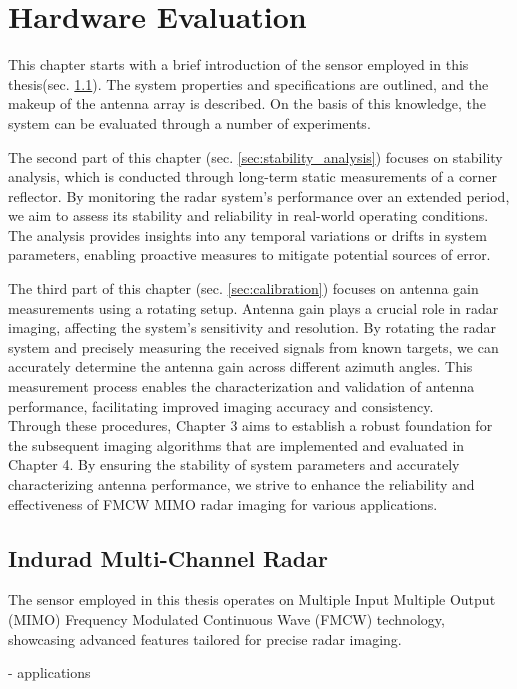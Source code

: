 \chapter{Hardware Evaluation}
\label{ch:hardware}
This chapter starts with a brief introduction of the sensor employed in this thesis(sec. \ref{sec:imcr}).
The system properties and specifications are outlined, and the makeup of the antenna array is described.
On the basis of this knowledge, the system can be evaluated through a number of experiments.

The second part of this chapter (sec. \ref{sec:stability_analysis}) focuses on stability analysis,
which is conducted through long-term static measurements of a corner reflector.
By monitoring the radar system's performance over an extended period,
we aim to assess its stability and reliability in real-world operating conditions.
The analysis provides insights into any temporal variations or drifts in system parameters,
enabling proactive measures to mitigate potential sources of error.

The third part of this chapter (sec. \ref{sec:calibration}) focuses on antenna gain measurements using a rotating setup.
Antenna gain plays a crucial role in radar imaging, affecting the system's sensitivity and resolution.
By rotating the radar system and precisely measuring the received signals from known targets,
we can accurately determine the antenna gain across different azimuth angles.
This measurement process enables the characterization and validation of antenna performance,
facilitating improved imaging accuracy and consistency. \\

Through these procedures, Chapter 3 aims to establish a robust foundation
for the subsequent imaging algorithms that are implemented and evaluated in Chapter 4.
By ensuring the stability of system parameters and accurately characterizing antenna performance,
we strive to enhance the reliability and effectiveness of FMCW MIMO radar imaging for various applications.

\section{Indurad Multi-Channel Radar}
\label{sec:imcr}
The sensor employed in this thesis operates on Multiple Input Multiple Output (MIMO) Frequency Modulated Continuous Wave (FMCW) technology,
showcasing advanced features tailored for precise radar imaging.

- applications


